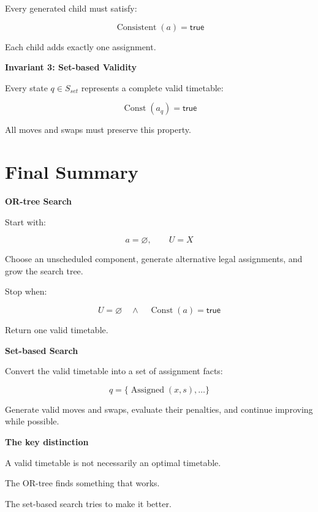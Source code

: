 \documentclass[11pt,letterpaper]{article}
\newcommand{\Assign}{\operatorname{Assigned}}
\newcommand{\Const}{\operatorname{Const}}
\newcommand{\Consistent}{\operatorname{Consistent}}
\begin{document}
Every generated child must satisfy:

\begin{equation}
\boxed{
\Consistent(a)=\mathsf{true}
}
\end{equation}

Each child adds exactly one assignment.

\textbf{Invariant 3: Set-based Validity}

Every state $q\in S_{set}$ represents
a complete valid timetable:

\begin{equation}
\boxed{
\Const(a_q)=\mathsf{true}
}
\end{equation}

All moves and swaps must preserve this property.

\section*{Final Summary}

\begin{idea}
\textbf{OR-tree Search}

Start with:

\[
a=\varnothing,\qquad U=X
\]

Choose an unscheduled component,
generate alternative legal assignments,
and grow the search tree.

Stop when:

\[
U=\varnothing
\quad\land\quad
\Const(a)=\mathsf{true}
\]

Return one valid timetable.

\vspace{8pt}

\textbf{Set-based Search}

Convert the valid timetable
into a set of assignment facts:

\[
q=\{\Assign(x,s),\ldots\}
\]

Generate valid moves and swaps,
evaluate their penalties, and
continue improving while possible.

\vspace{8pt}

\textbf{The key distinction}

A valid timetable is not necessarily
an optimal timetable.

The OR-tree finds something that works.

The set-based search tries to make it better.
\end{idea}
\end{document}
